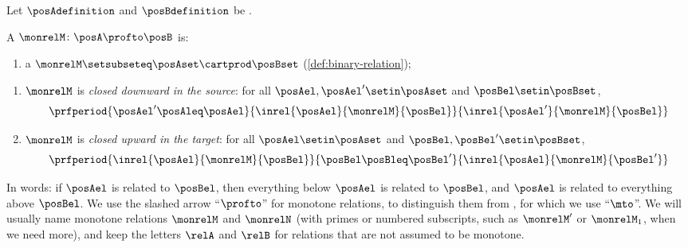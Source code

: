 \begin{ctdefinition}
    \label{def:monotone-relation}
    Let $\posAdefinition$ and $\posBdefinition$ be .
    
    A  $\monrelM \colon \posA \profto \posB$ is:

    \constit
    \begin{enumerate}
        \item a  $\monrelM \setsubseteq \posAset \cartprod \posBset$ (\cref{def:binary-relation});
    \end{enumerate}
    \condit
    \begin{enumerate}
        \item $\monrelM$ is \emph{closed downward in the source}: for all $\posAel, \posAel' \setin \posAset$ and $\posBel \setin \posBset$,
              \begin{equation}\label{eq:monrel-cond-source}
                  \prfperiod{
                      \posAel' \posAleq \posAel
                  }{
                      \inrel{\posAel}{\monrelM}{\posBel}
                  }{
                      \inrel{\posAel'}{\monrelM}{\posBel}
                  }
              \end{equation}
        \item $\monrelM$ is \emph{closed upward in the target}: for all $\posAel \setin \posAset$ and $\posBel, \posBel' \setin \posBset$,
              \begin{equation}\label{eq:monrel-cond-target}
                  \prfperiod{
                      \inrel{\posAel}{\monrelM}{\posBel}
                  }{
                      \posBel \posBleq \posBel'
                  }{
                      \inrel{\posAel}{\monrelM}{\posBel'}
                  }
              \end{equation}
    \end{enumerate}
\end{ctdefinition}

In words: if $\posAel$ is related to $\posBel$, then everything below $\posAel$ is related to $\posBel$, and $\posAel$ is related to everything above $\posBel$.
We use the slashed arrow ``$\profto$'' for monotone relations, to distinguish them from , for which we use ``$\mto$''.
We will usually name monotone relations $\monrelM$ and $\monrelN$ (with primes or numbered subscripts, such as $\monrelM'$ or $\monrelM_1$, when we need more), and keep the letters $\relA$ and $\relB$ for relations that are not assumed to be monotone.

